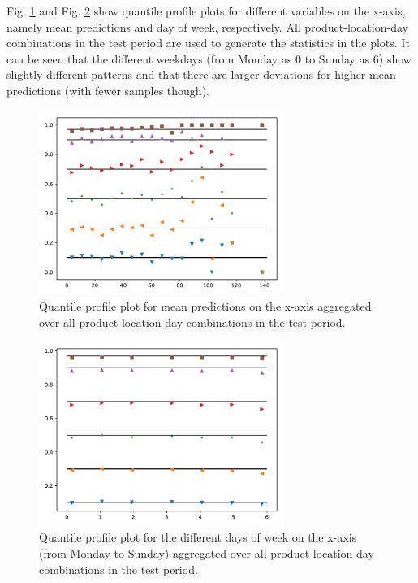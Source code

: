 \documentclass[BCOR=1mm, DIV=calc,10pt,
twoside=true,
twocolumn,
headings=normal]{scrartcl}
\newcommand{\fig}{Fig. }
\begin{document}
\fig \ref{fig:invquant_mean} and \fig \ref{fig:invquant_dayofweek} show quantile profile plots for different variables on the x-axis, namely mean predictions and day of week, respectively. All product-location-day combinations in the test period are used to generate the statistics in the plots. It can be seen that the different weekdays (from Monday as 0 to Sunday as 6) show slightly different patterns and that there are larger deviations for higher mean predictions (with fewer samples though).

\begin{figure}
\begin{center}
\includegraphics[width=8cm]{../figures/invquant_yhat_mean}
\caption{\label{fig:invquant_mean} Quantile profile plot for mean predictions on the x-axis aggregated over all product-location-day combinations in the test period.}
\end{center}
\end{figure}

\begin{figure}
\begin{center}
\includegraphics[width=8cm]{../figures/invquant_dayofweek}
\caption{\label{fig:invquant_dayofweek} Quantile profile plot for the different days of week on the x-axis (from Monday to Sunday) aggregated over all product-location-day combinations in the test period.}
\end{center}
\end{figure}
\end{document}
